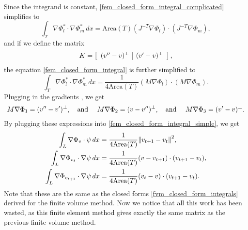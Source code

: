 Since the integrand is constant,
\eqref{fem_closed_form_integral_complicated} simplifies to
\begin{equation}\label{fem_closed_form_integral}
    \int_T \nabla\Phi_l^* \cdot \nabla\Phi_m^*\,dx
        = \text{Area}(T)(J^{-T}\nabla\Phi_l)\cdot(J^{-T}\nabla\Phi_m),
\end{equation}
and if we define the matrix
\begin{align*}
    K = \left[\begin{array}{c|c}
        (v^{\prime\prime} - v)^\perp & (v^{\prime} - v)^\perp
    \end{array}\right],
\end{align*}
the equation \eqref{fem_closed_form_integral} is further simplified to
\begin{equation}\label{fem_closed_form_integral_simple}
    \int_T \nabla\Phi_l^* \cdot \nabla\Phi_m^*\,dx
        = \frac{1}{4\text{Area}(T)} (M\nabla\Phi_l)\cdot(M\nabla\Phi_m).
\end{equation}
Plugging in the gradients \label{fem_reference_basis_function_gradients}, we get
\begin{equation}
    M\nabla\Phi_1 = (v^{\prime\prime} - v^{\prime})^\perp, \text{\quad and \quad}
    M\nabla\Phi_2 = (v - v^{\prime\prime})^\perp, \text{\quad and \quad}
    M\nabla\Phi_3 = (v^{\prime} - v)^\perp.
\end{equation}
By plugging these expressions into \eqref{fem_closed_form_integral_simple}, we get
\begin{align*}
    \int_L \nabla\Phi_v\cdot\psi\,dx
        &= \frac{1}{4\text{Area}(T)}\norm{v_{t+1} - v_t}^2,\\
    \int_L \nabla\Phi_{v_t}\cdot\nabla\psi\,dx
        &= \frac{1}{4\text{Area}(T)}(v - v_{t+1})\cdot(v_{t+1} - v_t),\\
    \int_L \nabla\Phi_{v_{t+1}}\cdot\nabla\psi\,dx
        &= \frac{1}{4\text{Area}(T)}(v_t - v)\cdot(v_{t+1} - v_t).
\end{align*}
Note that these are the same as the closed forms \eqref{fvm_closed_form_integrals} derived for the finite volume method.
Now we notice that all this work has been wasted, as this finite element method gives
exactly the same matrix as the previous finite volume method.

